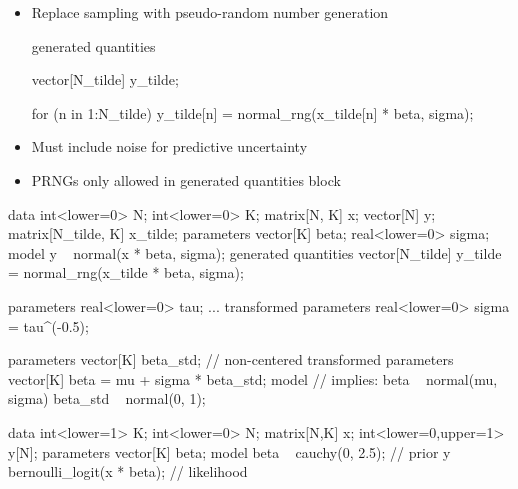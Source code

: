 \documentclass[10pt]{report}
\begin{document}
%
\begin{itemize}
\item Replace sampling with pseudo-random number generation
\begin{stancode}
   generated quantities {
     vector[N_tilde] y_tilde;

     for (n in 1:N_tilde)
       y_tilde[n] = normal_rng(x_tilde[n] * beta, sigma);
   }
\end{stancode}
\item Must include noise for predictive uncertainty
\item PRNGs only allowed in generated quantities block
\end{itemize}


%
\begin{stancode}
data {
  int<lower=0> N;               int<lower=0> K;
  matrix[N, K] x;               vector[N] y;
  matrix[N_tilde, K] x_tilde;
}
parameters {
  vector[K] beta;               real<lower=0> sigma;
}
model {
  y ~ normal(x * beta, sigma);
}
generated quantities {
  vector[N_tilde] y_tilde
    = normal_rng(x_tilde * beta, sigma);
}
\end{stancode}


%
\begin{stancode}
    parameters {
      real<lower=0> tau;
      ...
    }
    transformed parameters {
      real<lower=0> sigma = tau^(-0.5);
    }
\end{stancode}


%
\begin{stancode}
parameters {
  vector[K] beta_std;  // non-centered
}
transformed parameters {
  vector[K] beta =  mu + sigma * beta_std;
}
model {
  // implies:  beta ~ normal(mu, sigma)
  beta_std ~ normal(0, 1);
}
\end{stancode}


%
\begin{stancode}
     data {
       int<lower=1> K;
       int<lower=0> N;
       matrix[N,K] x;
       int<lower=0,upper=1> y[N];
     }
     parameters {
       vector[K] beta;
     }
     model {
        beta ~ cauchy(0, 2.5);          // prior
        y ~ bernoulli_logit(x * beta);  // likelihood
     }
\end{stancode}
\end{document}
